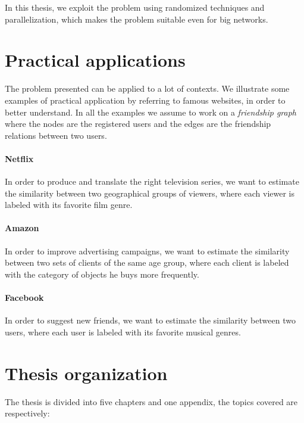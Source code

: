In this thesis, we exploit the problem using randomized techniques and parallelization, which makes the problem suitable even for big networks. 

\section{Practical applications}

The problem presented can be applied to a lot of contexts. 
We illustrate some examples of practical application by referring to famous websites,
in order to better understand.
In all the examples we assume to work on a \textit{friendship graph} where the nodes are the registered users and 
the edges are the friendship relations between two users.

\paragraph*{Netflix} In order to produce and translate the right television series, we want to estimate the similarity between two geographical groups of viewers, where each viewer is labeled with its favorite film genre.

\paragraph*{Amazon} In order to improve advertising campaigns, we want to estimate the similarity between two sets of clients of the same age group, where each client is labeled with the category of objects he buys more frequently.

\paragraph*{Facebook} In order to suggest new friends, we want to estimate the similarity between two users, where each user is labeled with its favorite musical genres.  

\section{Thesis organization}

The thesis is divided into five chapters and one appendix,
the topics covered are respectively:

